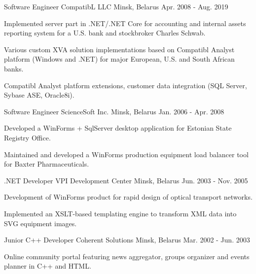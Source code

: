 \begin{cventries}
  \cventry
    {Software Engineer} %
    {CompatibL LLC} %
    {Minsk, Belarus} %
    {Apr. 2008 - Aug. 2019} %
    {
      \begin{cvitems} %
        \item {Implemented server part in .NET/.NET Core for accounting and internal assets reporting system for a U.S. bank and stockbroker Charles Schwab.}
        \item {Various custom XVA solution implementations based on Compatibl Analyst platform (Windows and .NET) for major European, U.S. and South African banks.}
        \item {Compatibl Analyst platform extensions, customer data integration (SQL Server, Sybase ASE, Oracle8i).}  
      \end{cvitems}
    }

  \cventry
    {Software Engineer} %
    {ScienceSoft Inc.} %
    {Minsk, Belarus} %
    {Jan. 2006 - Apr. 2008} %
    {
      \begin{cvitems} %
        \item {Developed a WinForms + SqlServer desktop application for Estonian State Registry Office.}
        \item {Maintained and developed a WinForms production equipment load balancer tool for Baxter Pharmaceuticals.}
      \end{cvitems}
    }

  \cventry
    {.NET Developer} %
    {VPI Development Center} %
    {Minsk, Belarus} %
    {Jun. 2003 - Nov. 2005} %
    {
      \begin{cvitems} %
        \item {Development of WinForms product for rapid design of optical transport networks.}
        \item {Implemented an XSLT-based templating engine to transform XML data into SVG equipment images.}
      \end{cvitems}
    }

  \cventry
    {Junior C++ Developer} %
    {Coherent Solutions} %
    {Minsk, Belarus} %
    {Mar. 2002 - Jun. 2003} %
    {
      \begin{cvitems} %
        \item {Online community portal featuring news aggregator, groups organizer and events planner in C++ and HTML.}
      \end{cvitems}
    }

\end{cventries}
